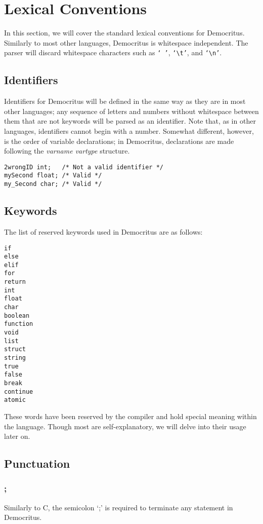 \chapter{Lexical Conventions}
	In this section, we will cover the standard lexical conventions for Democritus. Similarly to most other languages, Democritus is whitespace independent. The parser will discard whitespace characters such as \texttt{` '}, \texttt{`\textbackslash t'}, and \texttt{`\textbackslash n'}.
	
	\section{Identifiers}
		Identifiers for Democritus will be defined in the same way as they are in most other languages; any sequence of letters and numbers without whitespace between them that are not keywords will be parsed as an identifier. Note that, as in other languages, identifiers cannot begin with a number. Somewhat different, however, is the order of variable declarations; in Democritus, declarations are made following the \textit{varname vartype} structure. 
		
	\begin{lstlisting}
2wrongID int; 	/* Not a valid identifier */
mySecond float;	/* Valid */
my_Second char; /* Valid */
	\end{lstlisting}
	
	\section{Keywords}
		The list of reserved keywords used in Democritus are as follows:
		\begin{lstlisting}[language={}]
if
else
elif
for
return
int
float
char
boolean
function
void
list
struct
string
true
false
break
continue
atomic
		\end{lstlisting}
		\noindent These words have been reserved by the compiler and hold special meaning within the language. Though most are self-explanatory, we will delve into their usage later on. 
		
	\section{Punctuation}
		\subsection{;}
			Similarly to C, the semicolon `;' is required to terminate any statement in Democritus. 
